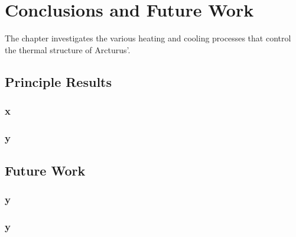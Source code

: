 \chapter{Conclusions and Future Work}
\label{chap:8}

The chapter investigates the various heating and cooling processes that control the thermal structure of Arcturus'.

\pagebreak

\section{Principle Results}\label{sec:8.1}
\subsection{x}\label{sec:8.1.1}
\subsection{y}\label{sec:8.1.2}
\section{Future Work}\label{sec:8.2}
\subsection{y}\label{sec:8.2.1}
\subsection{y}\label{sec:8.2.2}